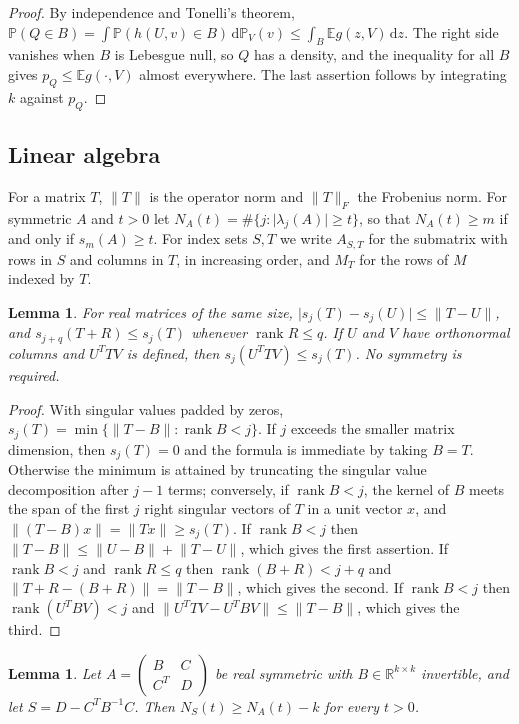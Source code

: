 \documentclass[11pt]{amsart}
\numberwithin{equation}{section}
\newtheorem{lemma}[theorem]{Lemma}
\theoremstyle{definition}
\theoremstyle{remark}
\newcommand{\R}{\mathbb R}
\newcommand{\E}{\mathbb E}
\newcommand{\PP}{\mathbb P}
\newcommand{\1}{\mathbf 1}
\newcommand{\dd}{\,\mathrm d}
\DeclareMathOperator{\rank}{rank}
\newcommand{\norm}[1]{\lVert #1\rVert}
\newcommand{\abs}[1]{\lvert #1\rvert}
\begin{document}
\begin{proof}
By independence and Tonelli's theorem, $\PP(Q\in B)=\int\PP(h(U,v)\in B)\dd\PP_V(v)\le\int_B\E g(z,V)\dd z$. The right side vanishes when $B$ is Lebesgue null, so $Q$ has a density, and the inequality for all $B$ gives $p_Q\le\E g(\cdot,V)$ almost everywhere. The last assertion follows by integrating $k$ against $p_Q$.
\end{proof}

\subsection{Linear algebra}
For a matrix $T$, $\norm T$ is the operator norm and $\norm T_F$ the Frobenius norm. For symmetric $A$ and $t>0$ let $N_A(t)=\#\{j:\abs{\lambda_j(A)}\ge t\}$, so that $N_A(t)\ge m$ if and only if $s_m(A)\ge t$. For index sets $S,T$ we write $A_{S,T}$ for the submatrix with rows in $S$ and columns in $T$, in increasing order, and $M_T$ for the rows of $M$ indexed by $T$.

\begin{lemma}\label{lem:weyl}
For real matrices of the same size, $\abs{s_j(T)-s_j(U)}\le\norm{T-U}$, and $s_{j+q}(T+R)\le s_j(T)$ whenever $\rank R\le q$. If $U$ and $V$ have orthonormal columns and $U^TTV$ is defined, then $s_j(U^TTV)\le s_j(T)$. No symmetry is required.
\end{lemma}

\begin{proof}
With singular values padded by zeros, $s_j(T)=\min\{\norm{T-B}:\rank B<j\}$. If $j$ exceeds the smaller matrix dimension, then $s_j(T)=0$ and the formula is immediate by taking $B=T$. Otherwise the minimum is attained by truncating the singular value decomposition after $j-1$ terms; conversely, if $\rank B<j$, the kernel of $B$ meets the span of the first $j$ right singular vectors of $T$ in a unit vector $x$, and $\norm{(T-B)x}=\norm{Tx}\ge s_j(T)$. If $\rank B<j$ then $\norm{T-B}\le\norm{U-B}+\norm{T-U}$, which gives the first assertion. If $\rank B<j$ and $\rank R\le q$ then $\rank(B+R)<j+q$ and $\norm{T+R-(B+R)}=\norm{T-B}$, which gives the second. If $\rank B<j$ then $\rank(U^TBV)<j$ and $\norm{U^TTV-U^TBV}\le\norm{T-B}$, which gives the third.
\end{proof}

\begin{lemma}\label{lem:schur}
Let $A=\begin{pmatrix}B&C\\C^T&D\end{pmatrix}$ be real symmetric with $B\in\R^{k\times k}$ invertible, and let $S=D-C^TB^{-1}C$. Then $N_S(t)\ge N_A(t)-k$ for every $t>0$.
\end{lemma}
\end{document}
